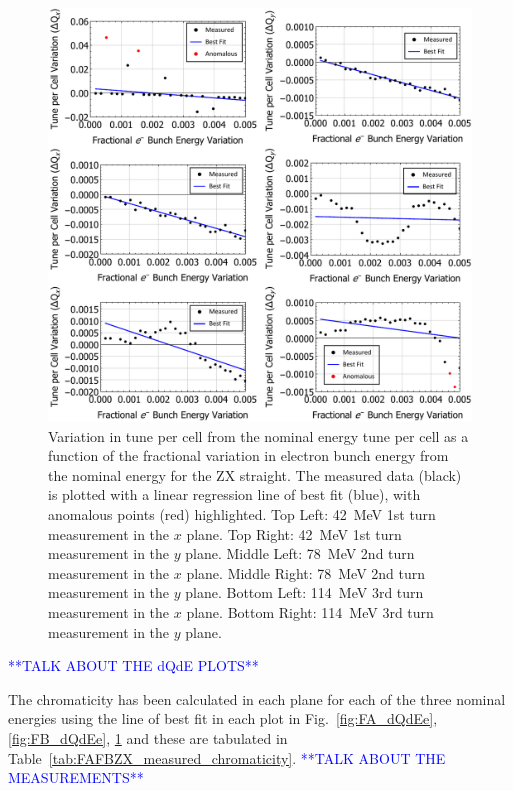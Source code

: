 \documentclass[../main.tex]{subfiles}
\begin{document}
\begin{figure}[!h]
\centering
\includegraphics[width=\textwidth]{Figures/CBETA_Multi-Pass_Commissioning/chromaticity/ZX_analysed_3turn_dQdEe.pdf}
\caption{Variation in tune per cell from the nominal energy tune per cell as a function of the fractional variation in electron bunch energy from the nominal energy for the ZX straight. The measured data (black) is plotted with a linear regression line of best fit (blue), with anomalous points (red) highlighted. Top Left: 42~\si{\mega\electronvolt} 1st turn measurement in the $x$ plane. Top Right: 42~\si{\mega\electronvolt} 1st turn measurement in the $y$ plane. Middle Left: 78~\si{\mega\electronvolt} 2nd turn measurement in the $x$ plane. Middle Right: 78~\si{\mega\electronvolt} 2nd turn measurement in the $y$ plane. Bottom Left: 114~\si{\mega\electronvolt} 3rd turn measurement in the $x$ plane. Bottom Right: 114~\si{\mega\electronvolt} 3rd turn measurement in the $y$ plane.}
\label{fig:ZX_dQdEe}
\end{figure}

\textcolor{blue}{**TALK ABOUT THE dQdE PLOTS**}

The chromaticity has been calculated in each plane for each of the three nominal energies using the line of best fit in each plot in Fig.~\ref{fig:FA_dQdEe}, \ref{fig:FB_dQdEe}, \ref{fig:ZX_dQdEe} and these are tabulated in Table~\ref{tab:FAFBZX_measured_chromaticity}. \textcolor{blue}{**TALK ABOUT THE MEASUREMENTS**} 
\end{document}
